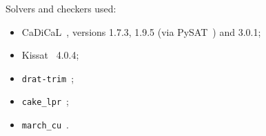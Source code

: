 \documentclass[11pt]{amsart}
\theoremstyle{definition}
\begin{document}
Solvers and checkers used:
\begin{itemize}
\item CaDiCaL~\cite{CaDiCaL}, versions 1.7.3, 1.9.5 (via PySAT~\cite{PySAT}) and 3.0.1;
\item Kissat~\cite{Kissat} 4.0.4;
\item \texttt{drat-trim}~\cite{dratTrim};
\item \texttt{cake\_lpr}~\cite{cakelpr};
\item \texttt{march\_cu}~\cite{HKWB11}.
\end{itemize}




\end{document}
